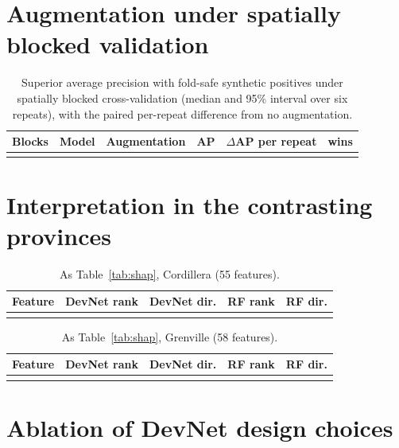 \documentclass[pdflatex,sn-apa]{sn-jnl}
\begin{document}
\begin{appendices}
\clearpage
\section{Augmentation under spatially blocked validation}\label{app:aug-spatial}

\begin{table}[!h]
\caption{Superior average precision with fold-safe synthetic positives under spatially blocked cross-validation (median and 95\% interval over six repeats), with the paired per-repeat difference from no augmentation.}\label{tab:aug-spatial}
\footnotesize
\begin{tabular*}{\textwidth}{@{\extracolsep\fill}lllccc}
\toprule
Blocks & Model & Augmentation & AP & $\Delta$AP per repeat & wins \\
\midrule
\botrule
\end{tabular*}
\end{table}

\clearpage
\section{Interpretation in the contrasting provinces}\label{app:shap}

\begin{table}[!h]
\caption{As Table~\ref{tab:shap}, Cordillera (55 features).}\label{tab:shap-cord}
\footnotesize
\begin{tabular*}{\textwidth}{@{\extracolsep\fill}lcccc}
\toprule
Feature & DevNet rank & DevNet dir. & RF rank & RF dir. \\
\midrule
\botrule
\end{tabular*}
\end{table}

\begin{table}[!h]
\caption{As Table~\ref{tab:shap}, Grenville (58 features).}\label{tab:shap-gren}
\footnotesize
\begin{tabular*}{\textwidth}{@{\extracolsep\fill}lcccc}
\toprule
Feature & DevNet rank & DevNet dir. & RF rank & RF dir. \\
\midrule
\botrule
\end{tabular*}
\end{table}

\clearpage
\section{Ablation of DevNet design choices}\label{app:sensitivity}


\end{appendices}
\end{document}
